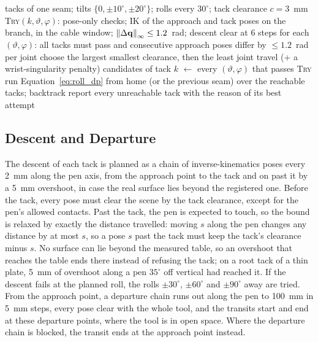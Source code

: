 \begin{algorithm}[htbp]
\caption{Reachability with a locked branch}
\label{alg:reach}
\begin{algorithmic}[1]
\REQUIRE tacks of one seam; tilts $\{0,\pm10^\circ,\pm20^\circ\}$; rolls every $30^\circ$; tack clearance $c=3$~mm
\STATE \textsc{Try}$(k,\vartheta,\varphi)$: pose-only checks; IK of the approach and tack poses on the branch, in the cable window; $\left\lVert\Delta\mathbf{q}\right\rVert_\infty\le1.2$~rad; descent clear at 6 steps
  \STATE for each $(\vartheta,\varphi)$: all tacks must pass and consecutive approach poses differ by $\le1.2$~rad per joint
  \STATE choose the largest smallest clearance, then the least joint travel (+ a wrist-singularity penalty)
\ELSE
  \STATE candidates of tack $k$ $\gets$ every $(\vartheta,\varphi)$ that passes \textsc{Try}
  \STATE run Equation~\ref{eq:roll_dp} from home (or the previous seam) over the reachable tacks; backtrack
\ENDIF
\STATE report every unreachable tack with the reason of its best attempt
\end{algorithmic}
\end{algorithm}

\subsection{Descent and Departure}
\label{sec:mc_descent}
The descent of each tack is planned as a chain of inverse-kinematics poses every 2~mm along the pen
axis, from the approach point to the tack and on past it by a 5~mm overshoot, in case the real surface
lies beyond the registered one. Before the tack, every pose must clear the scene by the tack clearance,
except for the pen's allowed contacts. Past the tack, the pen is expected to touch, so the bound is
relaxed by exactly the distance travelled: moving $s$ along the pen changes any distance by at most $s$,
so a pose $s$ past the tack must keep the tack's clearance minus $s$. No surface can lie beyond the
measured table, so an overshoot that reaches the table ends there instead of refusing the tack; on a
root tack of a thin plate, 5~mm of overshoot along a pen $35^\circ$ off vertical had reached it. If the
descent fails at the planned roll, the rolls $\pm30^\circ$, $\pm60^\circ$ and $\pm90^\circ$ away are
tried. From the approach point, a departure chain runs out along the pen to 100~mm in 5~mm steps, every
pose clear with the whole tool, and the transits start and end at these departure points, where the
tool is in open space. Where the departure chain is blocked, the transit ends at the approach point
instead.

